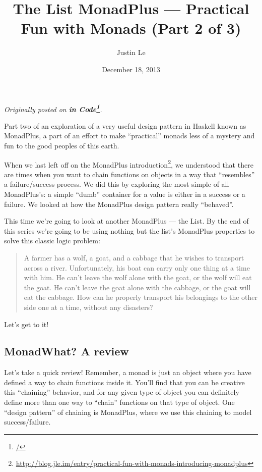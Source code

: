 \documentclass[]{article}
\title{The List MonadPlus --- Practical Fun with Monads (Part 2 of 3)}
\author{Justin Le}
\date{December 18, 2013}
\renewcommand{\href}[2]{#2\footnote{\url{#1}}}
\begin{document}
\maketitle

\emph{Originally posted on \textbf{\href{/}{in Code}}.}

Part two of an exploration of a very useful design pattern in Haskell
known as MonadPlus, a part of an effort to make ``practical'' monads
less of a mystery and fun to the good peoples of this earth.

When we last left off on the
\href{http://blog.jle.im/entry/practical-fun-with-monads-introducing-monadplus}{MonadPlus
introduction}, we understood that there are times when you want to chain
functions on objects in a way that ``resembles'' a failure/success
process. We did this by exploring the most simple of all MonadPlus's: a
simple ``dumb'' container for a value is either in a success or a
failure. We looked at how the MonadPlus design pattern really
``behaved''.

This time we're going to look at another MonadPlus --- the List. By the
end of this series we're going to be using nothing but the list's
MonadPlus properties to solve this classic logic problem:

\begin{quote}
A farmer has a wolf, a goat, and a cabbage that he wishes to transport
across a river. Unfortunately, his boat can carry only one thing at a
time with him. He can't leave the wolf alone with the goat, or the wolf
will eat the goat. He can't leave the goat alone with the cabbage, or
the goat will eat the cabbage. How can he properly transport his
belongings to the other side one at a time, without any disasters?
\end{quote}

Let's get to it!

\subsection{MonadWhat? A review}\label{monadwhat-a-review}

Let's take a quick review! Remember, a monad is just an object where you
have defined a way to chain functions inside it. You'll find that you
can be creative this ``chaining'' behavior, and for any given type of
object you can definitely define more than one way to ``chain''
functions on that type of object. One ``design pattern'' of chaining is
MonadPlus, where we use this chaining to model success/failure.
\end{document}
